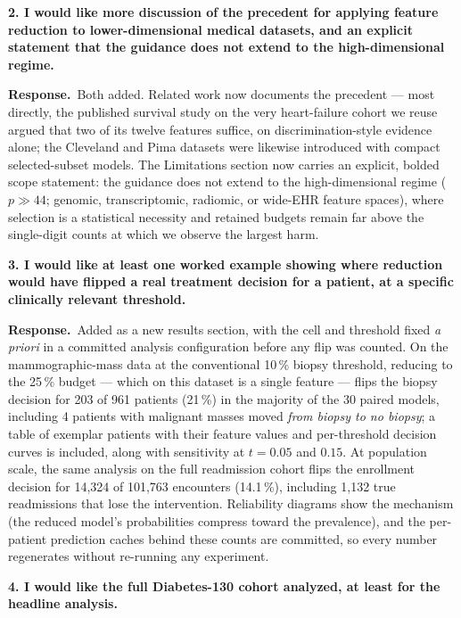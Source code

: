 \documentclass[11pt]{article}
\newcommand{\point}[1]{\par\medskip\noindent\textbf{\color{revblue}#1}\par\smallskip}
\newcommand{\reply}{\par\noindent\textbf{Response.}\ }
\begin{document}
\point{2. I would like more discussion of the precedent for applying feature reduction to
lower-dimensional medical datasets, and an explicit statement that the guidance does not extend to
the high-dimensional regime.}

\reply Both added. Related work now documents the precedent --- most directly, the published
survival study on the very heart-failure cohort we reuse argued that two of its twelve features
suffice, on discrimination-style evidence alone; the Cleveland and Pima datasets were likewise
introduced with compact selected-subset models. The Limitations section now carries an explicit,
bolded scope statement: the guidance does not extend to the high-dimensional regime ($p\gg44$;
genomic, transcriptomic, radiomic, or wide-EHR feature spaces), where selection is a statistical
necessity and retained budgets remain far above the single-digit counts at which we observe the
largest harm.

\point{3. I would like at least one worked example showing where reduction would have flipped a real
treatment decision for a patient, at a specific clinically relevant threshold.}

\reply Added as a new results section, with the cell and threshold fixed \emph{a priori} in a
committed analysis configuration before any flip was counted. On the mammographic-mass data at the
conventional 10\,\% biopsy threshold, reducing to the 25\,\% budget --- which on this dataset is a
single feature --- flips the biopsy decision for 203 of 961 patients (21\,\%) in the majority of the
30 paired models, including 4 patients with malignant masses moved \emph{from biopsy to no biopsy};
a table of exemplar patients with their feature values and per-threshold decision curves is
included, along with sensitivity at $t=0.05$ and $0.15$. At population scale, the same analysis on
the full readmission cohort flips the enrollment decision for 14{,}324 of 101{,}763 encounters
(14.1\,\%), including 1{,}132 true readmissions that lose the intervention. Reliability diagrams
show the mechanism (the reduced model's probabilities compress toward the prevalence), and the
per-patient prediction caches behind these counts are committed, so every number regenerates
without re-running any experiment.

\point{4. I would like the full Diabetes-130 cohort analyzed, at least for the headline analysis.}
\end{document}
